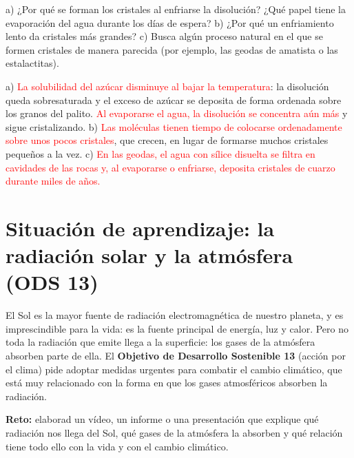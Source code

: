 \begin{exercise}
    a) ¿Por qué se forman los cristales al enfriarse la disolución? ¿Qué papel tiene la evaporación del agua durante los días de
    espera? b) ¿Por qué un enfriamiento lento da cristales más grandes? c) Busca algún proceso natural en el que se formen
    cristales de manera parecida (por ejemplo, las geodas de amatista o las estalactitas).
    \begin{solu}
        a) \textcolor{red}{La solubilidad del azúcar disminuye al bajar la temperatura}: la disolución queda sobresaturada y el
        exceso de azúcar se deposita de forma ordenada sobre los granos del palito. \textcolor{red}{Al evaporarse el agua, la
        disolución se concentra aún más} y sigue cristalizando. b) \textcolor{red}{Las moléculas tienen tiempo de colocarse
        ordenadamente sobre unos pocos cristales}, que crecen, en lugar de formarse muchos cristales pequeños a la vez.
        c) \textcolor{red}{En las geodas, el agua con sílice disuelta se filtra en cavidades de las rocas y, al evaporarse o
        enfriarse, deposita cristales de cuarzo durante miles de años.}
    \end{solu}
\end{exercise}

\section{Situación de aprendizaje: la radiación solar y la atmósfera (ODS 13)}\label{sec:ud3-ods}

El Sol es la mayor fuente de radiación electromagnética de nuestro planeta, y es imprescindible para la vida: es la fuente
principal de energía, luz y calor. Pero no toda la radiación que emite llega a la superficie: los gases de la atmósfera
absorben parte de ella. El \textbf{Objetivo de Desarrollo Sostenible 13} (acción por el clima) pide adoptar medidas urgentes
para combatir el cambio climático, que está muy relacionado con la forma en que los gases atmosféricos absorben la radiación.

\begin{marker}
    \textbf{Reto:} elaborad un vídeo, un informe o una presentación que explique qué radiación nos llega del Sol, qué gases de la
    atmósfera la absorben y qué relación tiene todo ello con la vida y con el cambio climático.
\end{marker}

